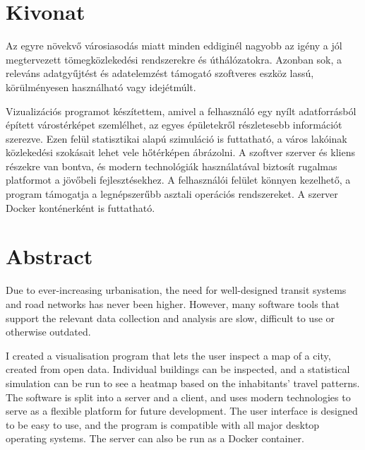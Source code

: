 \setcounter{page}{1}

\selecthungarian

\chapter*{Kivonat}

Az egyre növekvő városiasodás miatt minden eddiginél nagyobb az igény a jól megtervezett tömegközlekedési rendszerekre és úthálózatokra. Azonban sok, a releváns adatgyűjtést és adatelemzést támogató szoftveres eszköz lassú, körülményesen használható vagy idejétmúlt.

Vizualizációs programot készítettem, amivel a felhasználó egy nyílt adatforrásból épített várostérképet szemlélhet, az egyes épületekről részletesebb információt szerezve. Ezen felül statisztikai alapú szimuláció is futtatható, a város lakóinak közlekedési szokásait lehet vele hőtérképen ábrázolni. A szoftver szerver és kliens részekre van bontva, és modern technológiák használatával biztosít rugalmas platformot a jövőbeli fejlesztésekhez. A felhasználói felület könnyen kezelhető, a program támogatja a legnépszerűbb asztali operációs rendszereket. A szerver Docker konténerként is futtatható.


\vfill
\selectenglish


\chapter*{Abstract}

Due to ever-increasing urbanisation, the need for well-designed transit systems and road networks has never been higher. However, many software tools that support the relevant data collection and analysis are slow, difficult to use or otherwise outdated. 

I created a visualisation program that lets the user inspect a map of a city, created from open data. Individual buildings can be inspected, and a statistical simulation can be run to see a heatmap based on the inhabitants' travel patterns. The software is split into a server and a client, and uses modern technologies to serve as a flexible platform for future development. The user interface is designed to be easy to use, and the program is compatible with all major desktop operating systems. The server can also be run as a Docker container.




\vfill
\selectthesislanguage

\setcounter{romanPage}{\value{page}}
